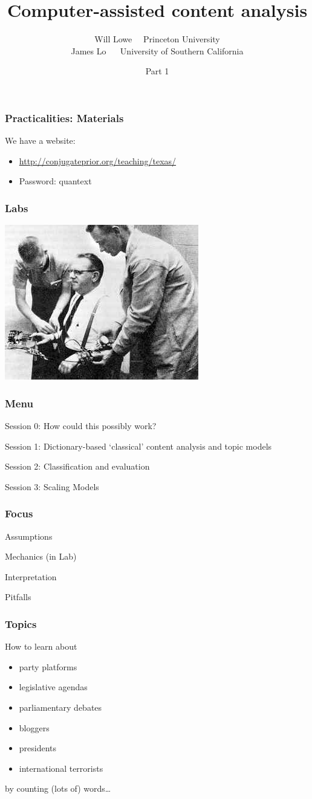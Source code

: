 \documentclass[11pt,compress,professionalfonts]{beamer}
\title{Computer-assisted content analysis}
\author{Will Lowe ~~Princeton University\\James Lo ~~ University of Southern California}
\date{Part 1}
\newcommand{\ita}{\begin{itemize}}
\newcommand{\itm}{\item[]}
\newcommand{\itz}{\end{itemize}}
\begin{document}
\maketitle


\begin{frame}[t]\frametitle{Practicalities: Materials}

We have a website:
\ita
\itm \url{http://conjugateprior.org/teaching/texas/}
\itm Password: quantext
\itz

\end{frame}
\begin{frame}[plain]\frametitle{Labs}

\centerline{\includegraphics[scale=0.17]{pictures/milgram-subject}}

\end{frame}
\begin{frame}[t]\frametitle{Menu}

Session 0: How could this possibly work?

Session 1: Dictionary-based `classical' content analysis and topic models

Session 2: Classification and evaluation

Session 3: Scaling Models


\end{frame}
\begin{frame}[t]\frametitle{Focus}

Assumptions

Mechanics (in Lab)

Interpretation

Pitfalls


%

\newpage

\end{frame}
\begin{frame}[t]\frametitle{Topics}
How to learn about
\ita
\item party platforms
\item legislative agendas
\item parliamentary debates
\item bloggers
\item presidents
\item international terrorists
\itz
by counting (lots of) words\ldots

\end{frame}
\end{document}
